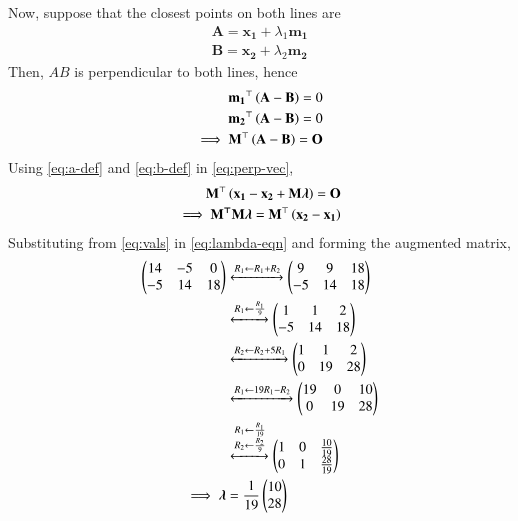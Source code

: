 \documentclass[journal,12pt,twocolumn]{IEEEtran}
\renewcommand{\vec}[1]{\boldsymbol{\mathbf{#1}}}
\begin{document}
\begin{enumerate}
    Now, suppose that the closest points on both lines are
    \begin{align}
        \vec{A} = \vec{x_1} + \lambda_1\vec{m_1} \label{eq:a-def} \\
        \vec{B} = \vec{x_2} + \lambda_2\vec{m_2}
        \label{eq:b-def}
    \end{align}
    Then, $AB$ is perpendicular to both lines, hence
    \begin{align}
        \vec{m_1}^\top\brak{\vec{A}-\vec{B}} = 0 \\
        \vec{m_2}^\top\brak{\vec{A}-\vec{B}} = 0 \\
        \implies \vec{M}^\top\brak{\vec{A}-\vec{B}} = \vec{O}
        \label{eq:perp-vec}
    \end{align}
    Using \eqref{eq:a-def} and \eqref{eq:b-def} in \eqref{eq:perp-vec},
    \begin{align}
        \vec{M}^\top\brak{\vec{x_1}-\vec{x_2} + \vec{M}\vec{\lambda}} = \vec{O} \\
        \implies \vec{M^\top M\lambda} = \vec{M}^\top\brak{\vec{x_2}-\vec{x_1}}
        \label{eq:lambda-eqn}
    \end{align}
    Substituting from \eqref{eq:vals} in \eqref{eq:lambda-eqn} and forming the 
    augmented matrix,
    \begin{align}
        \myvec{14&-5&0\\-5&14&18} &\xleftrightarrow[]{R_1\leftarrow R_1+R_2} \myvec{9&9&18\\-5&14&18} \\
                 &\xleftrightarrow[]{R_1\leftarrow\frac{R_1}{9}} \myvec{1&1&2\\-5&14&18} \\
                 &\xleftrightarrow[]{R_2\leftarrow R_2+5R_1} \myvec{1&1&2\\0&19&28} \\
                 &\xleftrightarrow[]{R_1\leftarrow19R_1-R_2} \myvec{19&0&10\\0&19&28} \\
                 &\xleftrightarrow[]{\substack{R_1\leftarrow\frac{R_1}{19}\\R_2\leftarrow\frac{R_2}{9}}}
                    \myvec{1&0&\frac{10}{19}\\0&1&\frac{28}{19}} \\
                    \implies \vec{\lambda} &= \frac{1}{19}\myvec{10\\28}
        \label{eq:lambda-sol}
    \end{align}

\end{enumerate}
\end{document}

